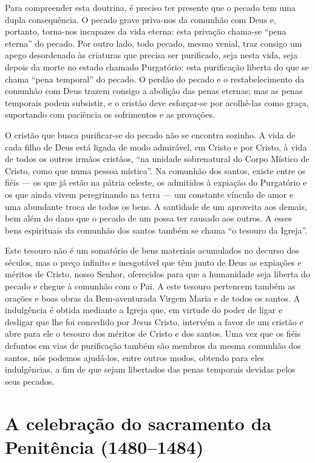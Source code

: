 Para compreender esta doutrina, é preciso ter presente que o pecado tem uma dupla consequência. O pecado grave priva-nos da comunhão com Deus e, portanto, torna-nos incapazes da vida eterna: esta privação chama-se ``pena eterna'' do pecado. Por outro lado, todo pecado, mesmo venial, traz consigo um apego desordenado às criaturas que precisa ser purificado, seja nesta vida, seja depois da morte no estado chamado Purgatório: esta purificação liberta do que se chama ``pena temporal'' do pecado. O perdão do pecado e o restabelecimento da comunhão com Deus trazem consigo a abolição das penas eternas; mas as penas temporais podem subsistir, e o cristão deve esforçar-se por acolhê-las como graça, suportando com paciência os sofrimentos e as provações.

O cristão que busca purificar-se do pecado não se encontra sozinho. A vida de cada filho de Deus está ligada de modo admirável, em Cristo e por Cristo, à vida de todos os outros irmãos cristãos, ``na unidade sobrenatural do Corpo Místico de Cristo, como que numa pessoa mística''. Na comunhão dos santos, existe entre os fiéis --- os que já estão na pátria celeste, os admitidos à expiação do Purgatório e os que ainda vivem peregrinando na terra --- um constante vínculo de amor e uma abundante troca de todos os bens. A santidade de um aproveita aos demais, bem além do dano que o pecado de um possa ter causado aos outros. A esses bens espirituais da comunhão dos santos também se chama ``o tesouro da Igreja''.

Este tesouro não é um somatório de bens materiais acumulados no decurso dos séculos, mas o preço infinito e inesgotável que têm junto de Deus as expiações e méritos de Cristo, nosso Senhor, oferecidos para que a humanidade seja liberta do pecado e chegue à comunhão com o Pai. A este tesouro pertencem também as orações e boas obras da Bem-aventurada Virgem Maria e de todos os santos. A indulgência é obtida mediante a Igreja que, em virtude do poder de ligar e desligar que lhe foi concedido por Jesus Cristo, intervém a favor de um cristão e abre para ele o tesouro dos méritos de Cristo e dos santos. Uma vez que os fiéis defuntos em vias de purificação também são membros da mesma comunhão dos santos, nós podemos ajudá-los, entre outros modos, obtendo para eles indulgências, a fim de que sejam libertados das penas temporais devidas pelos seus pecados.

\section{A celebração do sacramento da Penitência (1480--1484)}

